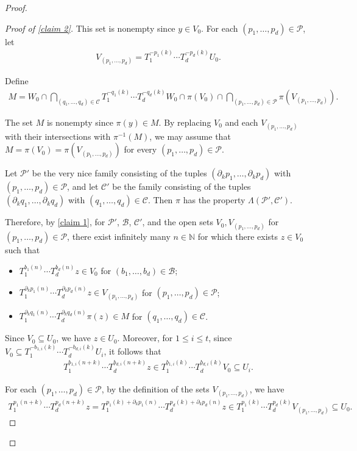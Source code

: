 \documentclass[11pt,reqno]{amsart}
\newcommand{\N}{\mathbb{N}}
\newcommand{\cB}{{\mathcal B}}
\newcommand{\cC}{{\mathcal C}}
\newcommand{\cP}{{\mathcal P}}
\theoremstyle{definition}
\theoremstyle{remark}
\begin{document}
\begin{proof}
\begin{proof}[Proof of \cref{claim 2}]
    This set is nonempty since $y\in V_0$. For each $(p_1,\dots,p_d)\in \cP$, let\begin{align*}
        V_{(p_1,\dots,p_d)} = T_1^{-p_1(k)}\cdots T_d^{-p_d(k)}U_0.
    \end{align*}
    
    Define\begin{align*}
        M= W_0 \cap \bigcap_{(q_1,\dots,q_d)\in \cC}T_1^{-q_1(k)}\cdots T_d^{-q_d(k)}W_0 \cap \pi(V_0) \cap \bigcap_{(p_1,\dots,p_d)\in \cP} \pi(V_{(p_1,\dots,p_d)}).
    \end{align*}

    The set $M$ is nonempty since $\pi(y)\in M$. By replacing $V_0$ and each $V_{(p_1,\dots,p_d)}$ with their intersections with $\pi^{-1}(M)$, we may assume that $M=\pi(V_0)=\pi(V_{(p_1,\dots,p_d)})$ for every $(p_1,\dots,p_d)\in \cP$.

    Let $\cP'$ be the very nice family consisting of the tuples $(\partial_k p_1,\dots,\partial_k p_d)$ with $(p_1,\dots,p_d)\in \cP$, and let $\cC'$ be the family consisting of the tuples $(\partial_k q_1,\dots,\partial_k q_d)$ with $(q_1,\dots,q_d)\in \cC$. Then $\pi$ has the property $\Lambda(\cP',\cC')$.
    
    Therefore, by \cref{claim 1}, for $\cP'$, $\cB$, $\cC'$, and the open sets $V_0,V_{(p_1,\dots,p_d)}$ for $(p_1,\dots,p_d)\in \cP$, there exist infinitely many $n\in\N$ for which there exists $z\in V_0$ such that
    
    \begin{itemize}
        \item $T_1^{b_1(n)}\cdots T_d^{b_d(n)}z\in V_0$ for $(b_1,\dots,b_d)\in \cB$;
        \item $T_1^{\partial_k p_1(n)}\cdots T_d^{\partial_k p_d(n)}z \in V_{(p_1,\dots,p_d)}$ for $(p_1,\dots,p_d)\in \cP$;
        \item $T_1^{\partial_k q_1(n)}\cdots T_d^{\partial_k q_d(n)}\pi(z)\in M$ for $(q_1,\dots,q_d)\in \cC$.
    \end{itemize}

    Since $V_0\subseteq U_0$, we have $z\in U_0$. Moreover, for $1\leq i \leq t$, since $V_0 \subseteq T_1^{-b_{1,i}(k)}\cdots T_d^{-b_{d,i}(k)}U_i$, it follows that\begin{align*}
        T_1^{b_{1,i}(n+k)}\cdots T_d^{b_{d,i}(n+k)}z \in T_1^{b_{1,i}(k)}\cdots T_d^{b_{d,i}(k)}V_0 \subseteq U_i.
    \end{align*}

    For each $(p_1,\dots,p_d)\in \cP$, by the definition of the sets $V_{(p_1,\dots,p_d)}$, we have\begin{align*}
        T_1^{p_1(n+k)}\cdots T_d^{p_d(n+k)}z = T_{1}^{p_1(k)+\partial_k p_1(n)}\cdots T_{d}^{p_d(k)+\partial_k p_d(n)}z \in T_1^{p_1(k)}\cdots T_d^{p_d(k)}V_{(p_1,\dots,p_d)} \subseteq U_0.
    \end{align*}


\end{proof}
\end{proof}
\end{document}
